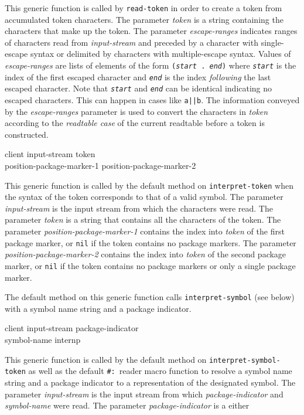 This generic function is called by \texttt{read-token} in order to
create a token from accumulated token characters.  The parameter
\textit{token} is a string containing the characters that make up the
token.  The parameter \textit{escape-ranges} indicates ranges of
characters read from \textit{input-stream} and preceded by a character
with single-escape syntax or delimited by characters with
multiple-escape syntax.  Values of \textit{escape-ranges} are lists of
elements of the form \texttt{(\textit{start}\ .\ \textit{end})} where
\texttt{\textit{start}} is the index of the first escaped character
and \texttt{\textit{end}} is the index \textit{following} the last
escaped character.  Note that \texttt{\textit{start}} and
\texttt{\textit{end}} can be identical indicating no escaped
characters.  This can happen in cases like \texttt{a||b}.  The
information conveyed by the \textit{escape-ranges} parameter is used
to convert the characters in \textit{token} according to the
\emph{readtable case} of the current readtable before a token is
constructed.

 {client input-stream token \\
  position-package-marker-1 position-package-marker-2}

This generic function is called by the default method on
\texttt{interpret-token} when the syntax of the token corresponds to
that of a valid symbol.  The parameter \textit{input-stream} is the
input stream from which the characters were read.  The parameter
\textit{token} is a string that contains all the characters of the
token.  The parameter \textit{position-package-marker-1} contains the
index into \textit{token} of the first package marker, or \texttt{nil}
if the token contains no package markers.  The parameter
\textit{position-package-marker-2} contains the index into
\textit{token} of the second package marker, or \texttt{nil} if the
token contains no package markers or only a single package marker.

The default method on this generic function calls
\texttt{interpret-symbol} (see below) with a symbol name string and a
package indicator.

 {client input-stream package-indicator \\
  symbol-name internp}

This generic function is called by the default method on
\texttt{interpret-symbol-token} as well as the default
\texttt{\#:}~reader macro function to resolve a symbol name string and
a package indicator to a representation of the designated symbol.  The
parameter \textit{input-stream} is the input stream from which
\textit{package-indicator} and \textit{symbol-name} were read.  The
parameter \textit{package-indicator} is a either

